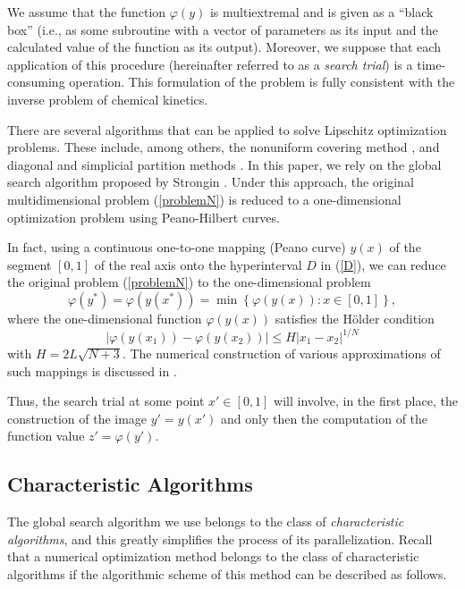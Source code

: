 \documentclass{svproc}
\begin{document}
We assume that the function $\varphi(y)$ is multiextremal and is given as a ``black box'' (i.e., as some subroutine with a vector of parameters as its input and the calculated value of the function as its output). Moreover, we suppose that each application of this procedure (hereinafter referred to as a \emph{search trial}) is a time-consuming operation. This formulation of the problem is fully consistent with the inverse problem of chemical kinetics.

There are several algorithms that can be applied to solve Lipschitz optimization problems. These include, among others, the nonuniform covering method \cite{Evtushenko2009,Evtushenko2013}, and diagonal and simplicial partition methods \cite{Zilinskas2010,Paulavicius2011}. In this paper, we rely on the global search algorithm proposed by Strongin \cite{Strongin2000}. Under this approach, the original multidimensional problem (\ref{problemN}) is reduced to a one-dimensional optimization problem using Peano-Hilbert curves.

In fact, using a continuous one-to-one mapping (Peano curve) $y(x)$ of the segment $[0,1]$ of the real axis onto the hyperinterval $D$ in (\ref{D}), we can reduce the original problem (\ref{problemN}) to the one-dimensional problem
\[
\varphi(y^\ast)=\varphi(y(x^\ast))=\min{\left\{\varphi(y(x)): x\in[0,1]\right\}},
\]
where the one-dimensional function $\varphi(y(x))$ satisfies the H{\"o}lder condition
\[
\left|\varphi(y(x_1))-\varphi(y(x_2))\right|\leq H\left|x_1-x_2\right|^{1/N}
\]
with $ H=2 L \sqrt{N+3}$.
The numerical construction of various approximations of such mappings is discussed in \cite{Sergeyev2013,Strongin2000}.

Thus, the search trial at some point $x'\in[0,1]$ will involve, in the first place, the construction of the image $y'=y(x')$ and only then the computation of the function value $z' = \varphi(y')$.

\subsection{Characteristic Algorithms}

The global search algorithm we use belongs to the class of \emph{characteristic algorithms}, and this greatly simplifies the process of its parallelization. Recall that a numerical optimization method belongs to the class of characteristic algorithms if the algorithmic scheme of this method can be described as follows.
\end{document}
